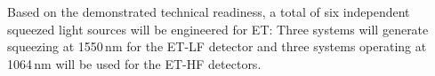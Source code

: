 Based on the demonstrated technical readiness, a total of six independent squeezed light sources will be engineered for ET: Three systems will generate squeezing at 1550\,nm for the ET-LF detector and three systems operating at 1064\,nm will be used for the ET-HF detectors. 

